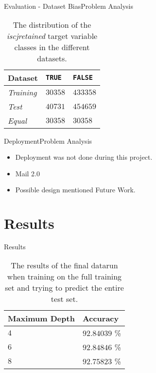 \documentclass[12pt,aspectratio=1610]{beamer}
\begin{document}
\begin{frame}{Evaluation - Dataset Bias}{Problem Analysis}
	\begin{table}[H]
	  \centering
	  \begin{tabular}{lll}
	    \textbf{Dataset}  & \texttt{TRUE} & \texttt{FALSE} \\ \hline
	    \textit{Training} & $30358$       & $433358$       \\
	    \textit{Test}     & $40731$       & $454659$       \\
	    \textit{Equal}    & $30358$       &  $30358$
	  \end{tabular}
	  \caption{The distribution of the \textit{iscjretained} target variable classes
	    in the different datasets.}
	  \label{tab:datasetretention}
	\end{table}
\end{frame}

\begin{frame}{Deployment}{Problem Analysis}
	\begin{itemize}
		\item Deployment was not done during this project.
		\item Mail 2.0
		\item Possible design mentioned Future Work.
	\end{itemize}
\end{frame}


\section{Results}

\begin{frame}{Results}
	\begin{table}[H]
	  \centering
	  \begin{tabular}{l|l}
	    \textbf{Maximum Depth} & \textbf{Accuracy} \\ \hline
	    $4$                    & $92.84039$ \%     \\
	    $6$                    & $92.84846$ \%     \\
	    $8$                    & $92.75823$ \%
	  \end{tabular}
	  \caption{The results of the final datarun when training on the full training
	    set and trying to predict the entire test set.}
	  \label{tab:results00}
	\end{table}
\end{frame}
\end{document}
